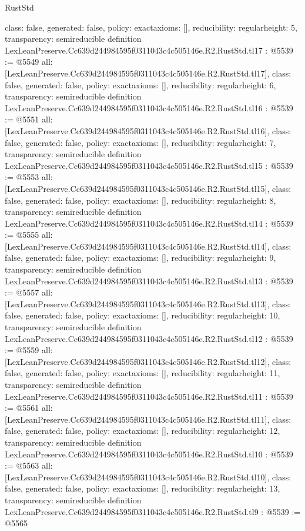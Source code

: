 \begin{lexlean}{RustStd}
\begin{coremodule}
{  class: false,
  generated: false,
  policy: exact{axioms: []},
  reducibility: regular{height: 5},
  transparency: semireducible
}
definition LexLeanPreserve.Cc639d244984595f0311043c4c505146e.R2.RustStd.tl17 : @5539 := @5549 {
  all: [LexLeanPreserve.Cc639d244984595f0311043c4c505146e.R2.RustStd.tl17],
  class: false,
  generated: false,
  policy: exact{axioms: []},
  reducibility: regular{height: 6},
  transparency: semireducible
}
definition LexLeanPreserve.Cc639d244984595f0311043c4c505146e.R2.RustStd.tl16 : @5539 := @5551 {
  all: [LexLeanPreserve.Cc639d244984595f0311043c4c505146e.R2.RustStd.tl16],
  class: false,
  generated: false,
  policy: exact{axioms: []},
  reducibility: regular{height: 7},
  transparency: semireducible
}
definition LexLeanPreserve.Cc639d244984595f0311043c4c505146e.R2.RustStd.tl15 : @5539 := @5553 {
  all: [LexLeanPreserve.Cc639d244984595f0311043c4c505146e.R2.RustStd.tl15],
  class: false,
  generated: false,
  policy: exact{axioms: []},
  reducibility: regular{height: 8},
  transparency: semireducible
}
definition LexLeanPreserve.Cc639d244984595f0311043c4c505146e.R2.RustStd.tl14 : @5539 := @5555 {
  all: [LexLeanPreserve.Cc639d244984595f0311043c4c505146e.R2.RustStd.tl14],
  class: false,
  generated: false,
  policy: exact{axioms: []},
  reducibility: regular{height: 9},
  transparency: semireducible
}
definition LexLeanPreserve.Cc639d244984595f0311043c4c505146e.R2.RustStd.tl13 : @5539 := @5557 {
  all: [LexLeanPreserve.Cc639d244984595f0311043c4c505146e.R2.RustStd.tl13],
  class: false,
  generated: false,
  policy: exact{axioms: []},
  reducibility: regular{height: 10},
  transparency: semireducible
}
definition LexLeanPreserve.Cc639d244984595f0311043c4c505146e.R2.RustStd.tl12 : @5539 := @5559 {
  all: [LexLeanPreserve.Cc639d244984595f0311043c4c505146e.R2.RustStd.tl12],
  class: false,
  generated: false,
  policy: exact{axioms: []},
  reducibility: regular{height: 11},
  transparency: semireducible
}
definition LexLeanPreserve.Cc639d244984595f0311043c4c505146e.R2.RustStd.tl11 : @5539 := @5561 {
  all: [LexLeanPreserve.Cc639d244984595f0311043c4c505146e.R2.RustStd.tl11],
  class: false,
  generated: false,
  policy: exact{axioms: []},
  reducibility: regular{height: 12},
  transparency: semireducible
}
definition LexLeanPreserve.Cc639d244984595f0311043c4c505146e.R2.RustStd.tl10 : @5539 := @5563 {
  all: [LexLeanPreserve.Cc639d244984595f0311043c4c505146e.R2.RustStd.tl10],
  class: false,
  generated: false,
  policy: exact{axioms: []},
  reducibility: regular{height: 13},
  transparency: semireducible
}
definition LexLeanPreserve.Cc639d244984595f0311043c4c505146e.R2.RustStd.tl9 : @5539 := @5565 {
}
\end{coremodule}
\end{lexlean}
